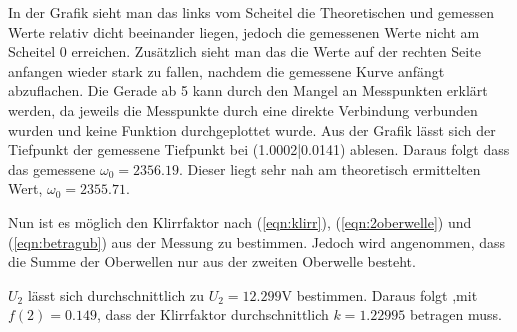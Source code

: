 In der Grafik sieht man das links vom Scheitel die Theoretischen und gemessen Werte relativ dicht beeinander liegen, jedoch die gemessenen Werte nicht am Scheitel 0 erreichen. Zusätzlich
sieht man das die Werte auf der rechten Seite anfangen wieder stark zu fallen, nachdem die gemessene Kurve anfängt abzuflachen. Die Gerade ab 5 kann durch den Mangel an Messpunkten
erklärt werden, da jeweils die Messpunkte durch eine direkte Verbindung verbunden wurden und keine Funktion durchgeplottet wurde.
Aus der Grafik lässt sich der Tiefpunkt der gemessene Tiefpunkt bei (1.0002|0.0141) ablesen. 
Daraus folgt dass das gemessene $\omega_0 = 2356.19$. Dieser liegt sehr nah am theoretisch ermittelten Wert, $\omega_0 = 2355.71$. 

Nun ist es möglich den Klirrfaktor nach (\ref{eqn:klirr}), (\ref{eqn:2oberwelle}) und (\ref{eqn:betragub}) aus der Messung zu bestimmen. Jedoch wird angenommen, 
dass die Summe der Oberwellen nur aus der zweiten Oberwelle besteht.

$U_2$ lässt sich durchschnittlich zu $U_2 = 12.299 \si{\volt}$ bestimmen. Daraus folgt ,mit $f(2) = 0.149$, dass der Klirrfaktor durchschnittlich $k = 1.22995$ betragen muss.
